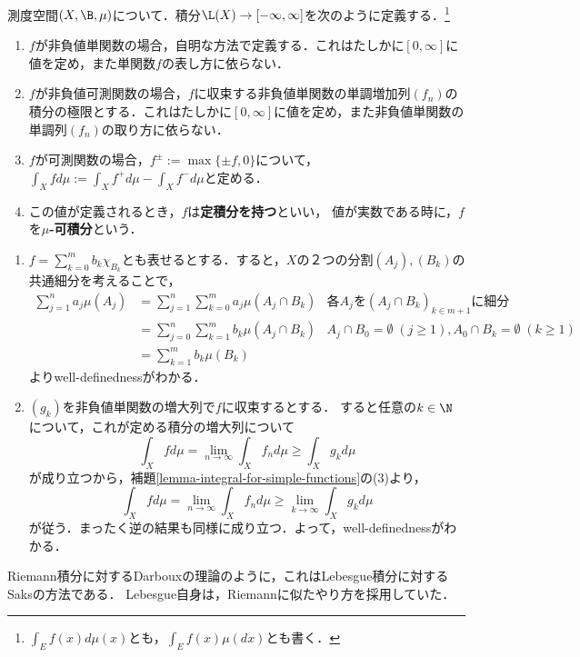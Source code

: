 \documentclass[uplatex, dvipdfmx]{jsreport}
\begin{document}
\begin{definition}[integrable]
    測度空間$(X,\B,\mu)$について．積分$\L(X)\to[-\infty,\infty]$を次のように定義する．\footnote{$\int_Ef(x)d\mu(x)$とも，$\int_Ef(x)\mu(dx)$とも書く．}
    \begin{enumerate}
        \item $f$が非負値単関数の場合，自明な方法で定義する．これはたしかに$[0,\infty]$に値を定め，また単関数$f$の表し方に依らない．
        \item $f$が非負値可測関数の場合，$f$に収束する非負値単関数の単調増加列$(f_n)$の積分の極限とする．これはたしかに$[0,\infty]$に値を定め，また非負値単関数の単調列$(f_n)$の取り方に依らない．
        \item $f$が可測関数の場合，$f^{\pm}:=\max\{\pm f,0\}$について，$\int_Xfd\mu:=\int_Xf^+d\mu-\int_Xf^-d\mu$と定める．
        \item この値が定義されるとき，$f$は\textbf{定積分を持つ}といい，
        値が実数である時に，$f$を\textbf{$\mu$-可積分}という．
    \end{enumerate}
\end{definition}
\begin{Proof}\mbox{}
    \begin{enumerate}
        \item $f=\sum^m_{k=0}b_k\chi_{B_k}$とも表せるとする．すると，$X$の２つの分割$(A_j),(B_k)$の共通細分を考えることで，
        \begin{align*}
            \sum^n_{j=1}a_j\mu(A_j)&=\sum^n_{j=1}\sum^m_{k=0}a_j\mu(A_j\cap B_k)&各A_jを(A_j\cap B_k)_{k\in m+1}に細分\\
            &=\sum^n_{j=0}\sum^m_{k=1}b_k\mu(A_j\cap B_k)&A_j\cap B_0=\emptyset\;(j\ge 1),A_0\cap B_k=\emptyset\;(k\ge 1)\\
            &=\sum^m_{k=1}b_k\mu(B_k)
        \end{align*}
        よりwell-definednessがわかる．
        \item $(g_k)$を非負値単関数の増大列で$f$に収束するとする．
        すると任意の$k\in\N$について，これが定める積分の増大列について
        \[\int_Xfd\mu=\lim_{n\to\infty}\int_Xf_nd\mu\ge\int_Xg_kd\mu\]
        が成り立つから，補題\ref{lemma-integral-for-simple-functions}の(3)より，
        \[\int_Xfd\mu=\lim_{n\to\infty}\int_Xf_nd\mu\ge\lim_{k\to\infty}\int_Xg_kd\mu\]
        が従う．まったく逆の結果も同様に成り立つ．よって，well-definednessがわかる．
    \end{enumerate}
\end{Proof}
\begin{history}
    Riemann積分に対するDarbouxの理論のように，これはLebesgue積分に対するSaksの方法である\cite{Saks}．
    Lebesgue自身は，Riemannに似たやり方を採用していた．
\end{history}
\end{document}
